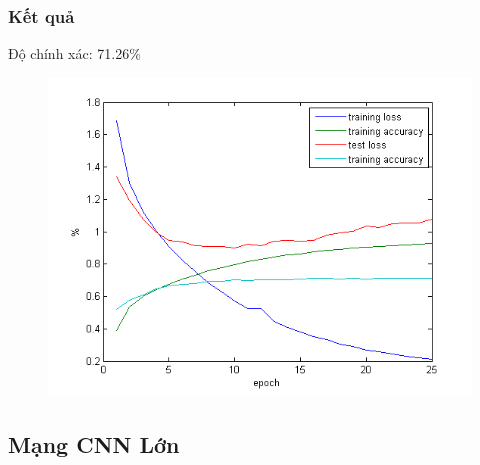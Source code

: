 \documentclass[a4paper,12pt]{report}
\begin{document}
\subsubsection{Kết quả}
Độ chính xác: 71.26\%
\begin{figure}[H]
\begin{center}
\includegraphics[width =1.0 \textwidth]{testImg.png}
\end{center}
\end{figure}
\subsection{Mạng CNN Lớn}
\end{document}
